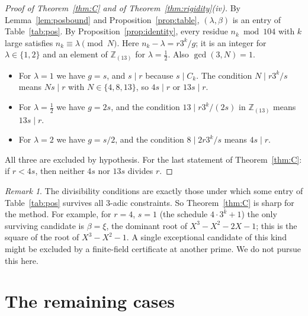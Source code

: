 \documentclass[11pt,a4paper]{article}
\theoremstyle{definition}
\theoremstyle{remark}
\newtheorem{remark}[theorem]{Remark}
\newcommand{\Z}{\mathbb{Z}}
\begin{document}
\begin{proof}[Proof of Theorem~\ref{thm:C} and of Theorem~\ref{thm:rigidity}\textup{(iv)}]
By Lemma~\ref{lem:posbound} and Proposition~\ref{prop:table}, $(\lambda,\beta)$ is an entry of Table~\ref{tab:pos}.
By Proposition~\ref{prop:identity}, every residue $n_k\bmod104$ with $k$ large satisfies $n_k\equiv\lambda\pmod N$.
Here $n_k-\lambda=r3^k/g$; it is an integer for $\lambda\in\{1,2\}$ and an element of $\Z_{(13)}$ for $\lambda=\frac12$. Also $\gcd(3,N)=1$.
\begin{itemize}
\item For $\lambda=1$ we have $g=s$, and $s\mid r$ because $s\mid C_k$. The condition $N\mid r3^k/s$ means $Ns\mid r$ with $N\in\{4,8,13\}$, so $4s\mid r$ or $13s\mid r$.
\item For $\lambda=\frac12$ we have $g=2s$, and the condition $13\mid r3^k/(2s)$ in $\Z_{(13)}$ means $13s\mid r$.
\item For $\lambda=2$ we have $g=s/2$, and the condition $8\mid 2r3^k/s$ means $4s\mid r$.
\end{itemize}
All three are excluded by hypothesis.
For the last statement of Theorem~\ref{thm:C}: if $r<4s$, then neither $4s$ nor $13s$ divides $r$.
\end{proof}

\begin{remark}
The divisibility conditions are exactly those under which some entry of Table~\ref{tab:pos} survives all $3$-adic constraints. So Theorem~\ref{thm:C} is sharp for the method.
For example, for $r=4$, $s=1$ (the schedule $4\cdot3^k+1$) the only surviving candidate is $\beta=\xi$, the dominant root of $X^3-X^2-2X-1$; this is the square of the root of $X^3-X^2-1$.
A single exceptional candidate of this kind might be excluded by a finite-field certificate at another prime. We do not pursue this here.
\end{remark}

\section{The remaining cases}\label{sec:residual}
\end{document}
